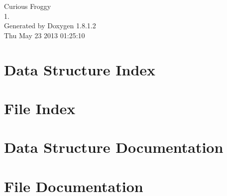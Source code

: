 \documentclass{book}
\begin{document}
\hypersetup{pageanchor=false,citecolor=blue}
\begin{titlepage}
\vspace*{7cm}
\begin{center}
{\Large Curious Froggy \\[1ex]\large 1. }\\
\vspace*{1cm}
{\large Generated by Doxygen 1.8.1.2}\\
\vspace*{0.5cm}
{\small Thu May 23 2013 01:25:10}\\
\end{center}
\end{titlepage}
\clearemptydoublepage
{}
\tableofcontents
\clearemptydoublepage
{}
\hypersetup{pageanchor=true,citecolor=blue}
\chapter{Data Structure Index}

\chapter{File Index}

\chapter{Data Structure Documentation}




















\chapter{File Documentation}













\printindex
\end{document}

